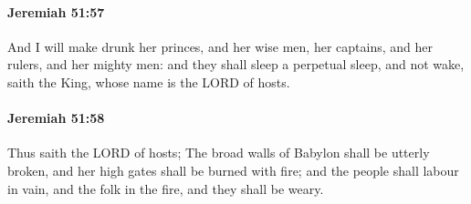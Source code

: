 		\paragraph{Jeremiah 51:57} %
			\label{JEREMIAH-51-57}

			And I will make drunk her princes, and her wise men, her captains, and her rulers, and her mighty men: and they shall sleep a perpetual sleep, and not wake, saith the King, whose name is the LORD of hosts.


		\paragraph{Jeremiah 51:58} %
			\label{JEREMIAH-51-58}

			Thus saith the LORD of hosts; The broad walls of Babylon shall be utterly broken, and her high gates shall be burned with fire; and the people shall labour in vain, and the folk in the fire, and they shall be weary.

